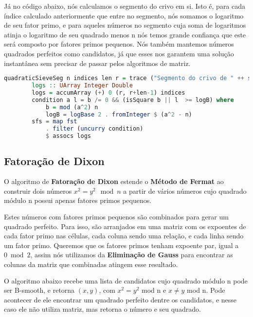 \documentclass{article}
\begin{document}
Já no código abaixo, nós calculamos o segmento do crivo em si. Isto é, para cada índice calculado anteriormente que entre no segmento, nós somamos o logaritmo de seu fator primo, e para aqueles números no segmento cuja soma de logaritmos atinja o logaritmo de seu quadrado menos n nós temos grande confiança que este será composto por fatores primos pequenos. Nós também mantemos números quadrados perfeitos como candidatos, já que esses nos garantem uma solução instantânea sem precisar de passar pelos algoritmos de matriz.

\begin{minipage}{0.9\linewidth}
    \begin{lstlisting}[language=haskell,caption=Crivo Quadrático - Segmento]
    quadraticSieveSeg n indices len r = trace ("Segmento do crivo de " ++ show r ++ " a " ++ show (r+len-1) ++ " com " ++ show (length sfs) ++ " candidatos encontrados") sfs where
        logs :: UArray Integer Double
        logs = accumArray (+) 0 (r, r+len-1) indices
        condition a l = b /= 0 && (isSquare b || l  >= logB) where
            b = mod (a^2) n
            logB = logBase 2 . fromInteger $ (a^2 - n)
        sfs = map fst
            . filter (uncurry condition)
            $ assocs logs
    \end{lstlisting}
    \end{minipage}    

\subsection{Fatoração de Dixon}
\label{dixon}
O algoritmo de \textbf{Fatoração de Dixon} estende o \textbf{Método de Fermat} ao construir dois números $x^2 = y^2 \mod n$ a partir de vários números cujo quadrado módulo n possui apenas fatores primos pequenos.

Estes números com fatores primos pequenos são combinados para gerar um quadrado perfeito. Para isso, são arranjados em uma matriz com os expoentes de cada fator primo nas células, cada coluna sendo uma relação, e cada linha sendo um fator primo. Queremos que os fatores primos tenham expoente par, igual a $0 \bmod 2$, assim nós utilizamos da \textbf{Eliminação de Gauss} para encontrar as colunas da matriz que combinadas atingem esse resultado.

O algoritmo abaixo recebe uma lista de candidatos cujo quadrado módulo n pode ser B-smooth, e retorna $(x, y)$, com $x^2 = y^2$ mod n e $x \neq y$ mod n. Pode acontecer de ele encontrar um quadrado perfeito dentre os candidatos, e nesse caso ele não utiliza matriz, mas retorna o número e seu quadrado.
\end{document}

